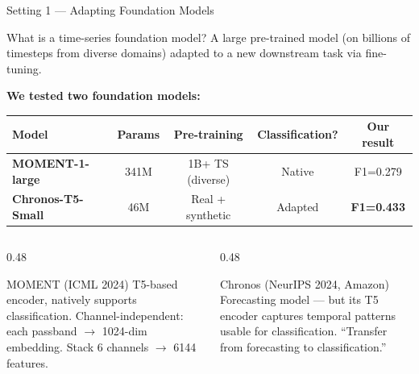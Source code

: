 \documentclass[aspectratio=169, 10pt]{beamer}
\begin{document}
\begin{frame}{Setting 1 — Adapting Foundation Models}
  \begin{block}{What is a time-series foundation model?}
    A large pre-trained model (on billions of timesteps from diverse domains)
    adapted to a new downstream task via fine-tuning.
  \end{block}
  \vspace{0.5em}
  \textbf{We tested two foundation models:}
  \vspace{0.3em}
  \begin{center}
  \begin{tabular}{lcccc}
    \toprule
    Model & Params & Pre-training & Classification? & Our result \\
    \midrule
    \textbf{MOMENT-1-large} & 341M & 1B+ TS (diverse) & Native & F1=0.279 \\
    \textcolor{myblue}{\textbf{Chronos-T5-Small}} & \textcolor{myblue}{46M} & \textcolor{myblue}{Real + synthetic} & \textcolor{myblue}{Adapted} & \textcolor{myblue}{\textbf{F1=0.433}} \\
    \bottomrule
  \end{tabular}
  \end{center}
  \vspace{0.5em}
  \begin{columns}
    \begin{column}{0.48\textwidth}
      \begin{block}{MOMENT (ICML 2024)}
        \small T5-based encoder, natively supports classification.
        Channel-independent: each passband $\to$ 1024-dim embedding.
        Stack 6 channels $\to$ 6144 features.
      \end{block}
    \end{column}
    \begin{column}{0.48\textwidth}
      \begin{block}{Chronos (NeurIPS 2024, Amazon)}
        \small Forecasting model — but its T5 encoder captures
        temporal patterns usable for classification.
        ``Transfer from forecasting to classification.''
      \end{block}
    \end{column}
  \end{columns}
\end{frame}
\end{document}
